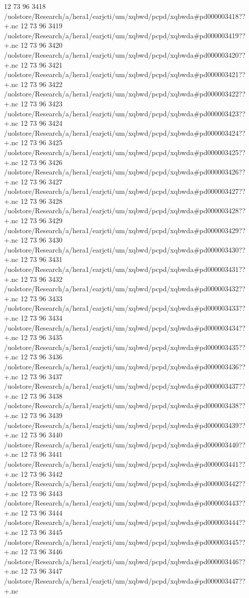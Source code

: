 12 73 96
3418
/uolstore/Research/a/hera1/earjcti/um/xqbwd/pcpd/xqbwda#pd000003418??+.nc
12 73 96
3419
/uolstore/Research/a/hera1/earjcti/um/xqbwd/pcpd/xqbwda#pd000003419??+.nc
12 73 96
3420
/uolstore/Research/a/hera1/earjcti/um/xqbwd/pcpd/xqbwda#pd000003420??+.nc
12 73 96
3421
/uolstore/Research/a/hera1/earjcti/um/xqbwd/pcpd/xqbwda#pd000003421??+.nc
12 73 96
3422
/uolstore/Research/a/hera1/earjcti/um/xqbwd/pcpd/xqbwda#pd000003422??+.nc
12 73 96
3423
/uolstore/Research/a/hera1/earjcti/um/xqbwd/pcpd/xqbwda#pd000003423??+.nc
12 73 96
3424
/uolstore/Research/a/hera1/earjcti/um/xqbwd/pcpd/xqbwda#pd000003424??+.nc
12 73 96
3425
/uolstore/Research/a/hera1/earjcti/um/xqbwd/pcpd/xqbwda#pd000003425??+.nc
12 73 96
3426
/uolstore/Research/a/hera1/earjcti/um/xqbwd/pcpd/xqbwda#pd000003426??+.nc
12 73 96
3427
/uolstore/Research/a/hera1/earjcti/um/xqbwd/pcpd/xqbwda#pd000003427??+.nc
12 73 96
3428
/uolstore/Research/a/hera1/earjcti/um/xqbwd/pcpd/xqbwda#pd000003428??+.nc
12 73 96
3429
/uolstore/Research/a/hera1/earjcti/um/xqbwd/pcpd/xqbwda#pd000003429??+.nc
12 73 96
3430
/uolstore/Research/a/hera1/earjcti/um/xqbwd/pcpd/xqbwda#pd000003430??+.nc
12 73 96
3431
/uolstore/Research/a/hera1/earjcti/um/xqbwd/pcpd/xqbwda#pd000003431??+.nc
12 73 96
3432
/uolstore/Research/a/hera1/earjcti/um/xqbwd/pcpd/xqbwda#pd000003432??+.nc
12 73 96
3433
/uolstore/Research/a/hera1/earjcti/um/xqbwd/pcpd/xqbwda#pd000003433??+.nc
12 73 96
3434
/uolstore/Research/a/hera1/earjcti/um/xqbwd/pcpd/xqbwda#pd000003434??+.nc
12 73 96
3435
/uolstore/Research/a/hera1/earjcti/um/xqbwd/pcpd/xqbwda#pd000003435??+.nc
12 73 96
3436
/uolstore/Research/a/hera1/earjcti/um/xqbwd/pcpd/xqbwda#pd000003436??+.nc
12 73 96
3437
/uolstore/Research/a/hera1/earjcti/um/xqbwd/pcpd/xqbwda#pd000003437??+.nc
12 73 96
3438
/uolstore/Research/a/hera1/earjcti/um/xqbwd/pcpd/xqbwda#pd000003438??+.nc
12 73 96
3439
/uolstore/Research/a/hera1/earjcti/um/xqbwd/pcpd/xqbwda#pd000003439??+.nc
12 73 96
3440
/uolstore/Research/a/hera1/earjcti/um/xqbwd/pcpd/xqbwda#pd000003440??+.nc
12 73 96
3441
/uolstore/Research/a/hera1/earjcti/um/xqbwd/pcpd/xqbwda#pd000003441??+.nc
12 73 96
3442
/uolstore/Research/a/hera1/earjcti/um/xqbwd/pcpd/xqbwda#pd000003442??+.nc
12 73 96
3443
/uolstore/Research/a/hera1/earjcti/um/xqbwd/pcpd/xqbwda#pd000003443??+.nc
12 73 96
3444
/uolstore/Research/a/hera1/earjcti/um/xqbwd/pcpd/xqbwda#pd000003444??+.nc
12 73 96
3445
/uolstore/Research/a/hera1/earjcti/um/xqbwd/pcpd/xqbwda#pd000003445??+.nc
12 73 96
3446
/uolstore/Research/a/hera1/earjcti/um/xqbwd/pcpd/xqbwda#pd000003446??+.nc
12 73 96
3447
/uolstore/Research/a/hera1/earjcti/um/xqbwd/pcpd/xqbwda#pd000003447??+.nc

